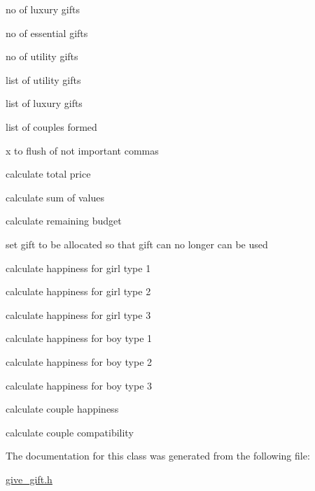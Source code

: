 no of luxury gifts

no of essential gifts

no of utility gifts

list of utility gifts

list of luxury gifts

list of couples formed

x to flush of not important commas

calculate total price

calculate sum of values

calculate remaining budget

set gift to be allocated so that gift can no longer can be used

calculate happiness for girl type 1

calculate happiness for girl type 2

calculate happiness for girl type 3

calculate happiness for boy type 1

calculate happiness for boy type 2

calculate happiness for boy type 3

calculate couple happiness

calculate couple compatibility 

The documentation for this class was generated from the following file\+:\begin{DoxyCompactItemize}
\item 
\hyperlink{give__gift_8h}{give\+\_\+gift.\+h}\end{DoxyCompactItemize}
